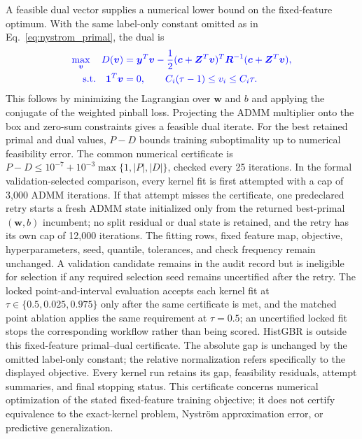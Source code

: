 {\color{blue}A feasible dual vector supplies a numerical lower bound on the fixed-feature optimum. With the same label-only constant omitted as in Eq.~\eqref{eq:nystrom_primal}, the dual is}
\begin{equation}
\label{eq:feature_dual_bound}
{\color{blue}\begin{aligned}
\max_{\boldsymbol{v}}\quad D(\boldsymbol{v})
&=\boldsymbol{y}^T\boldsymbol{v}-\frac12(\boldsymbol{c}+\boldsymbol{Z}^T\boldsymbol{v})^T
\boldsymbol{R}^{-1}(\boldsymbol{c}+\boldsymbol{Z}^T\boldsymbol{v}),\\
\text{s.t.}\quad \mathbf1^T\boldsymbol{v}&=0,\qquad C_i(\tau-1)\le v_i\le C_i\tau.
\end{aligned}}
\end{equation}
{\color{blue}This follows by minimizing the Lagrangian over $\boldsymbol{w}$ and $b$ and applying the conjugate of the weighted pinball loss. Projecting the ADMM multiplier onto the box and zero-sum constraints gives a feasible dual iterate. For the best retained primal and dual values, $P-D$ bounds training suboptimality up to numerical feasibility error. The common numerical certificate is $P-D\le10^{-7}+10^{-3}\max\{1,|P|,|D|\}$, checked every 25 iterations. In the formal validation-selected comparison, every kernel fit is first attempted with a cap of 3,000 ADMM iterations. If that attempt misses the certificate, one predeclared retry starts a fresh ADMM state initialized only from the returned best-primal $(\boldsymbol{w},b)$ incumbent; no split residual or dual state is retained, and the retry has its own cap of 12,000 iterations. The fitting rows, fixed feature map, objective, hyperparameters, seed, quantile, tolerances, and check frequency remain unchanged. A validation candidate remains in the audit record but is ineligible for selection if any required selection seed remains uncertified after the retry. The locked point-and-interval evaluation accepts each kernel fit at $\tau\in\{0.5,0.025,0.975\}$ only after the same certificate is met, and the matched point ablation applies the same requirement at $\tau=0.5$; an uncertified locked fit stops the corresponding workflow rather than being scored. HistGBR is outside this fixed-feature primal--dual certificate. The absolute gap is unchanged by the omitted label-only constant; the relative normalization refers specifically to the displayed objective. Every kernel run retains its gap, feasibility residuals, attempt summaries, and final stopping status. This certificate concerns numerical optimization of the stated fixed-feature training objective; it does not certify equivalence to the exact-kernel problem, Nystr\"{o}m approximation error, or predictive generalization.}

